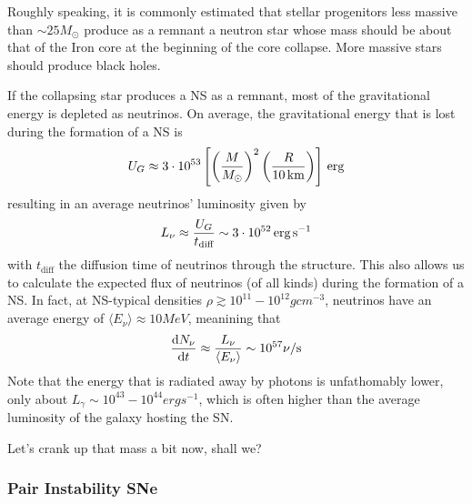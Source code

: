 Roughly speaking, it is commonly estimated that stellar progenitors less massive than $\sim25M_{\odot}$ produce as a remnant a neutron star whose mass should be about that of the Iron core at the beginning of the core collapse. More massive stars should produce black holes.
\par If the collapsing star produces a NS as a remnant, most of the gravitational energy is depleted as neutrinos. On average, the gravitational energy that is lost during the formation of a NS is
\begin{equation*}
    U_{G} \approx 3\cdot 10^{53}\left[\left(\frac{M}{M_{\odot}}\right)^{2}\left(\frac{R}{10\,\text{km}}\right)\right]\,\text{erg}
\end{equation*}
resulting in an average neutrinos' luminosity given by 
\begin{equation*}
    L_{\nu} \approx \frac{U_{G}}{t_{\text{diff}}} \sim 3\cdot 10^{52}\,\text{erg}\,\text{s}^{-1}
\end{equation*}
with $t_{\text{diff}}$ the diffusion time of neutrinos through the structure. This also allows us to calculate the expected flux of neutrinos (of all kinds) during the formation of a NS. In fact, at NS-typical densities $\rho \gtrsim 10^{11}-10^{12}\unit{g}\unit{cm}^{-3}$, neutrinos have an average energy of $\langle E_{\nu} \rangle \approx 10\unit{MeV}$, meanining that
\begin{equation*}
    \frac{\text{d}N_{\nu}}{\text{d}t} \approx \frac{L_{\nu}}{\langle E_{\nu} \rangle} \sim 10^{57} \nu/\text{s}
\end{equation*}
Note that the energy that is radiated away by photons is unfathomably lower, only about $L_{\gamma} \sim 10^{43}-10^{44}\unit{erg}\unit{s}^{-1}$, which is often higher than the average luminosity of the galaxy hosting the SN.
\par Let's crank up that mass a bit now, shall we?

\subsubsection{Pair Instability SNe}

